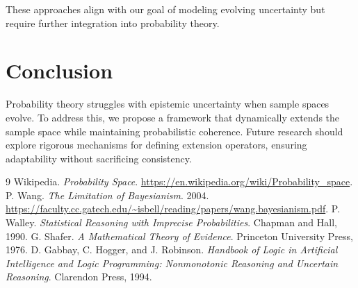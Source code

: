 \documentclass{article}
\begin{document}
These approaches align with our goal of modeling evolving uncertainty but require further integration into probability theory.

\section*{Conclusion}
Probability theory struggles with epistemic uncertainty when sample spaces evolve. To address this, we propose a framework that dynamically extends the sample space while maintaining probabilistic coherence. Future research should explore rigorous mechanisms for defining extension operators, ensuring adaptability without sacrificing consistency.

\begin{thebibliography}{9}
 Wikipedia. \textit{Probability Space}. \url{https://en.wikipedia.org/wiki/Probability_space}.
 P. Wang. \textit{The Limitation of Bayesianism}. 2004. \url{https://faculty.cc.gatech.edu/~isbell/reading/papers/wang.bayesianism.pdf}.
 P. Walley. \textit{Statistical Reasoning with Imprecise Probabilities}. Chapman and Hall, 1990.
 G. Shafer. \textit{A Mathematical Theory of Evidence}. Princeton University Press, 1976.
 D. Gabbay, C. Hogger, and J. Robinson. \textit{Handbook of Logic in Artificial Intelligence and Logic Programming: Nonmonotonic Reasoning and Uncertain Reasoning}. Clarendon Press, 1994.
\end{thebibliography}
\end{document}

